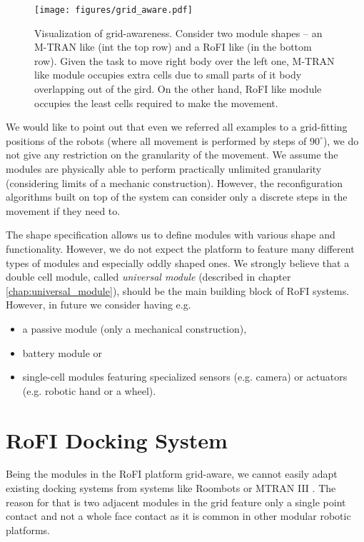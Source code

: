\begin{figure}
    \centering
    \texttt{[image: figures/grid\_aware.pdf]}
    \caption{Visualization of grid-awareness. Consider two module shapes -- an
    M-TRAN\cite{haruhisa_kurokawa_m-tran_2003} like (int the top row) and a RoFI
    like (in the bottom row). Given the task to move right body over the left
    one, M-TRAN like module occupies extra cells due to small parts of it body
    overlapping out of the gird. On the other hand, RoFI like module occupies
    the least cells required to make the movement. }
    \label{fig:grid_aware}
\end{figure}

We would like to point out that even we referred all examples to a grid-fitting
positions of the robots (where all movement is performed by steps of
$90^\circ$), we do not give any restriction on the granularity of the movement.
We assume the modules are physically able to perform practically unlimited
granularity (considering limits of a mechanic construction). However, the
reconfiguration algorithms built on top of the system can consider only a
discrete steps in the movement if they need to.

The shape specification allows us to define modules with various shape and
functionality. However, we do not expect the platform to feature many different
types of modules and especially oddly shaped ones. We strongly believe that a
double cell module, called \emph{universal module} (described in chapter
\ref{chap:universal_module}), should be the main building block of RoFI systems.
However, in future we consider having e.g.
\begin{itemize}
    \item a passive module (only a mechanical construction),
    \item battery module or
    \item single-cell modules featuring specialized sensors (e.g. camera) or
    actuators (e.g. robotic hand or a wheel).
\end{itemize}


\section{RoFI Docking System}\label{sec:dock}

Being the modules in the RoFI platform grid-aware, we cannot easily adapt
existing docking systems from systems like
Roombots\cite{bonardi_locomotion_2012} or MTRAN III
\cite{kurokawa_distributed_2008}. The reason for that is two adjacent modules in
the grid feature only a single point contact and not a whole face contact as it
is common in other modular robotic platforms.

